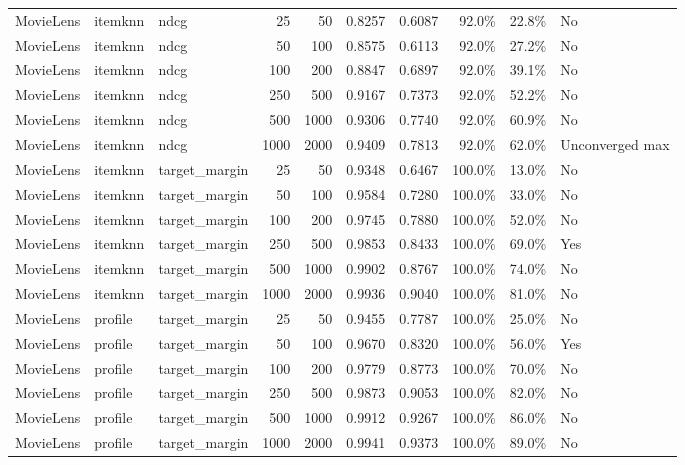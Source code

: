 \begin{longtable}{@{}p{.12\linewidth}p{.08\linewidth}p{.11\linewidth}rrrrrrp{.10\linewidth}@{}}
MovieLens & itemknn & ndcg & 25 & 50 & 0.8257 & 0.6087 & 92.0\% & 22.8\% & No \\
MovieLens & itemknn & ndcg & 50 & 100 & 0.8575 & 0.6113 & 92.0\% & 27.2\% & No \\
MovieLens & itemknn & ndcg & 100 & 200 & 0.8847 & 0.6897 & 92.0\% & 39.1\% & No \\
MovieLens & itemknn & ndcg & 250 & 500 & 0.9167 & 0.7373 & 92.0\% & 52.2\% & No \\
MovieLens & itemknn & ndcg & 500 & 1000 & 0.9306 & 0.7740 & 92.0\% & 60.9\% & No \\
MovieLens & itemknn & ndcg & 1000 & 2000 & 0.9409 & 0.7813 & 92.0\% & 62.0\% & Unconverged max \\
MovieLens & itemknn & target\_margin & 25 & 50 & 0.9348 & 0.6467 & 100.0\% & 13.0\% & No \\
MovieLens & itemknn & target\_margin & 50 & 100 & 0.9584 & 0.7280 & 100.0\% & 33.0\% & No \\
MovieLens & itemknn & target\_margin & 100 & 200 & 0.9745 & 0.7880 & 100.0\% & 52.0\% & No \\
MovieLens & itemknn & target\_margin & 250 & 500 & 0.9853 & 0.8433 & 100.0\% & 69.0\% & Yes \\
MovieLens & itemknn & target\_margin & 500 & 1000 & 0.9902 & 0.8767 & 100.0\% & 74.0\% & No \\
MovieLens & itemknn & target\_margin & 1000 & 2000 & 0.9936 & 0.9040 & 100.0\% & 81.0\% & No \\
MovieLens & profile & target\_margin & 25 & 50 & 0.9455 & 0.7787 & 100.0\% & 25.0\% & No \\
MovieLens & profile & target\_margin & 50 & 100 & 0.9670 & 0.8320 & 100.0\% & 56.0\% & Yes \\
MovieLens & profile & target\_margin & 100 & 200 & 0.9779 & 0.8773 & 100.0\% & 70.0\% & No \\
MovieLens & profile & target\_margin & 250 & 500 & 0.9873 & 0.9053 & 100.0\% & 82.0\% & No \\
MovieLens & profile & target\_margin & 500 & 1000 & 0.9912 & 0.9267 & 100.0\% & 86.0\% & No \\
MovieLens & profile & target\_margin & 1000 & 2000 & 0.9941 & 0.9373 & 100.0\% & 89.0\% & No \\
\end{longtable}
